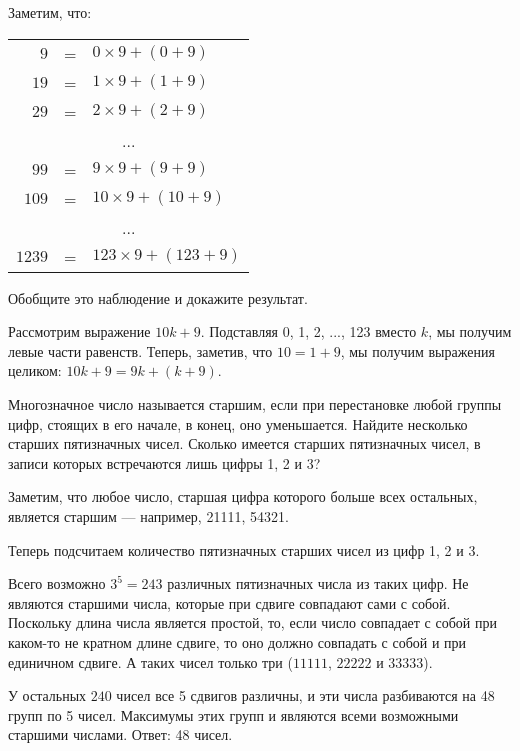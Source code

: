 \begin{itemize}
\itB Заметим, что:

\begin{center}\begin{tabular}{rcl}
$9$ & = & $0 \times 9 + (0+9)$ \\
$19$ & = & $1 \times 9 + (1+9)$ \\
$29$ & = & $2 \times 9 + (2+9)$ \\
\multicolumn{3}{c}{...} \\
$99$ & = & $9 \times 9 + (9+9)$ \\
$109$ & = & $10 \times 9 + (10+9)$ \\
\multicolumn{3}{c}{...} \\
$1239$ & = & $123 \times 9 + (123+9)$
\end{tabular}\end{center}

Обобщите это наблюдение и докажите результат.

\itr
Рассмотрим выражение $10k+9$.
Подставляя 0, 1, 2, ..., 123 вместо $k$, мы получим левые части равенств.
Теперь, заметив, что $10=1+9$, мы получим выражения целиком:
$10k+9=9k+(k+9)$.

\itC Многозначное число называется старшим, если при перестановке любой 
группы цифр, стоящих в его начале, в конец, оно уменьшается. Найдите 
несколько старших пятизначных чисел. Сколько имеется старших пятизначных 
чисел, в записи которых встречаются лишь цифры 1, 2 и 3?

\itr 
Заметим, что любое число, старшая цифра 
которого больше всех остальных, является старшим --- например, 21111, 54321. 

Теперь подсчитаем количество пятизначных старших чисел из цифр 1, 2 и 3.

Всего возможно $3^5 = 243$ различных пятизначных числа из таких цифр.
Не являются старшими числа, которые при сдвиге совпадают 
сами с собой. Поскольку длина числа является простой, то, если число совпадает 
с собой при каком-то не кратном длине сдвиге, то оно должно совпадать с собой 
и при единичном сдвиге. А таких чисел только три ($11111$, $22222$ и $33333$). 

У остальных $240$ чисел все 5 сдвигов различны, и эти числа разбиваются
на 48 групп по 5 чисел. 
Максимумы этих групп и являются всеми возможными старшими числами. Ответ: 48 чисел.
\end{itemize}


